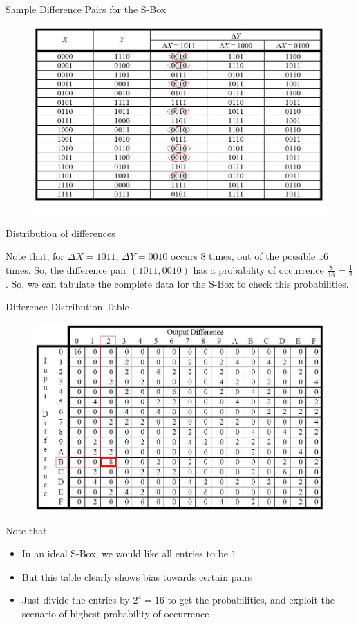 \documentclass[9pt]{beamer}
\begin{document}
\begin{frame}
Sample Difference Pairs for the S-Box

\begin{figure}
\includegraphics[totalheight=0.6\textheight]{spn_sbox_diffpairs.jpg}
\end{figure}

Distribution of differences

Note that, for $\Delta X = 1011$, $\Delta Y = 0010$ occurs $8$ times, out of the possible $16$ times. So, the difference pair $(1011,0010)$ has a probability of occurrence $\frac{8}{16} = \frac{1}{2}$. So, we can tabulate the complete data for the S-Box to check this probabilities.
\end{frame}

\begin{frame}
Difference Distribution Table

\begin{figure}
\includegraphics[totalheight=0.6\textheight]{spn_sbox_disttable.jpg}
\end{figure}

Note that
\begin{itemize}
\item{In an ideal S-Box, we would like all entries to be $1$}
\item{But this table clearly shows bias towards certain pairs}
\item{Just divide the entries by $2^4 = 16$ to get the probabilities, and exploit the scenario of highest probability of occurrence}
\end{itemize}
\end{frame}
\end{document}
